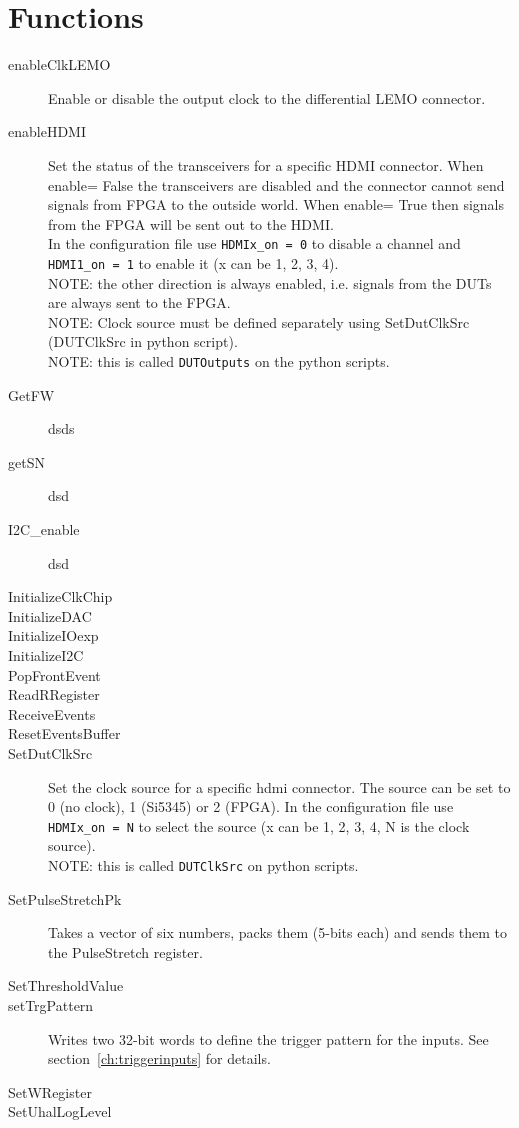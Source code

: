 \section{Functions}
\begin{description}
  \item[enableClkLEMO] Enable or disable the output clock to the differential LEMO connector.
  \item[enableHDMI] Set the status of the transceivers for a specific HDMI connector. When enable= False the transceivers are disabled and the connector cannot send signals from FPGA to the outside world. When enable= True then signals from the FPGA will be sent out to the HDMI.\\ In the configuration file use \verb|HDMIx_on = 0| to disable a channel and \verb|HDMI1_on = 1| to enable it (x can be 1, 2, 3, 4).\\
      NOTE: the other direction is always enabled, i.e. signals from the DUTs are always sent to the FPGA.\\
      NOTE: Clock source must be defined separately using SetDutClkSrc (DUTClkSrc in python script).\\
      NOTE: this is called \verb|DUTOutputs| on the python scripts.
  \item[GetFW] dsds
  \item[getSN] dsd
  \item[I2C\_enable] dsd
  \item[InitializeClkChip]
  \item[InitializeDAC]
  \item[InitializeIOexp]
  \item[InitializeI2C]
  \item[PopFrontEvent]
  \item[ReadRRegister]
  \item[ReceiveEvents]
  \item[ResetEventsBuffer]
  \item[SetDutClkSrc] Set the clock source for a specific \gls{hdmi} connector. The source can be set to 0 (no clock), 1 (Si5345) or 2 (FPGA). In the configuration file use \verb|HDMIx_on = N| to select the source (x can be 1, 2, 3, 4, N is the clock source).\\
      NOTE: this is called \verb|DUTClkSrc| on python scripts.
  \item[SetPulseStretchPk] Takes a vector of six numbers, packs them (5-bits each) and sends them to the PulseStretch register.
  \item[SetThresholdValue]
  \item[setTrgPattern] Writes two 32-bit words to define the trigger pattern for the inputs. See section~\ref{ch:triggerinputs} for details.
  \item[SetWRegister]
  \item[SetUhalLogLevel]
\end{description}


